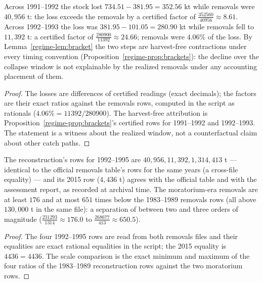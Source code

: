 \begin{proposition}
\label{regime-prop:moratorium}
Across 1991--1992 the stock lost \(734.51 - 381.95 = 352.56\) kt while
removals were \(40{,}956\) t: the loss exceeds the removals by a
certified factor of \(\tfrac{352560}{40956} \approx 8.61\). Across
1992--1993 the loss was \(381.95 - 101.05 = 280.90\) kt while removals
fell to \(11{,}392\) t: a certified factor of
\(\tfrac{280900}{11392} \approx 24.66\); removals were \(4.06\%\) of
the loss. By Lemma~\ref{regime-lem:bracket} the two steps are harvest-free
contractions under every timing convention
(Proposition~\ref{regime-prop:brackets}): the decline over the collapse window
is not explainable by the realized removals under any accounting
placement of them.
\end{proposition}

\begin{proof}
The losses are differences of certified readings (exact decimals);
the factors are their exact ratios against the removals rows, computed
in the script as rationals (\(4.06\% = 11392/280900\)). The
harvest-free attribution is Proposition~\ref{regime-prop:brackets}'s
certified rows for 1991--1992 and 1992--1993. The statement is a
witness about the realized window, not a counterfactual claim about
other catch paths.
\end{proof}

\begin{proposition}
\label{regime-prop:catchrecord}
The reconstruction's rows for 1992--1995 are
\(40{,}956, 11{,}392, 1{,}314, 413\) t --- identical to the official
removals table's rows for the same years (a cross-file equality) --- and
its 2015 row (\(4{,}436\) t) agrees with the official table and with
the assessment report, as recorded at archival time. The
moratorium-era removals are at least \(176\) and at most \(651\)
times below the 1983--1989 removals rows (all above \(130{,}000\) t in
the same file): a separation of between two and three orders of
magnitude (\(\tfrac{231293}{1314} \approx 176.0\) to
\(\tfrac{268677}{413} \approx 650.5\)).
\end{proposition}

\begin{proof}
The four 1992--1995 rows are read from both removals files and their
equalities are exact rational equalities in the script; the 2015
equality is \(4436 = 4436\). The scale comparison is the exact minimum
and maximum of the four ratios of the 1983--1989 reconstruction rows
against the two moratorium rows.
\end{proof}


